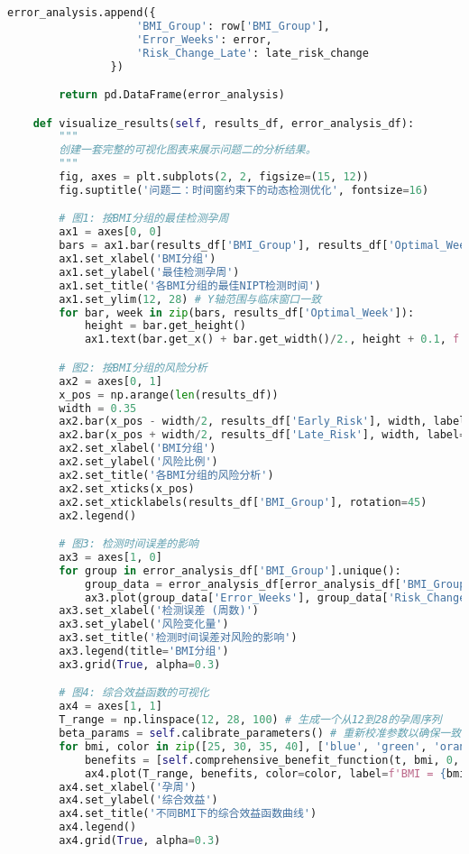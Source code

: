 \documentclass[UTF8, a4paper, 11pt]{ctexart}
\begin{document}
\begin{lstlisting}[language=Python, caption={问题二的解决方案脚本。}]
                error_analysis.append({
                    'BMI_Group': row['BMI_Group'],
                    'Error_Weeks': error,
                    'Risk_Change_Late': late_risk_change
                })

        return pd.DataFrame(error_analysis)

    def visualize_results(self, results_df, error_analysis_df):
        """
        创建一套完整的可视化图表来展示问题二的分析结果。
        """
        fig, axes = plt.subplots(2, 2, figsize=(15, 12))
        fig.suptitle('问题二：时间窗约束下的动态检测优化', fontsize=16)

        # 图1: 按BMI分组的最佳检测孕周
        ax1 = axes[0, 0]
        bars = ax1.bar(results_df['BMI_Group'], results_df['Optimal_Week'], color='steelblue', alpha=0.7, edgecolor='black')
        ax1.set_xlabel('BMI分组')
        ax1.set_ylabel('最佳检测孕周')
        ax1.set_title('各BMI分组的最佳NIPT检测时间')
        ax1.set_ylim(12, 28) # Y轴范围与临床窗口一致
        for bar, week in zip(bars, results_df['Optimal_Week']):
            height = bar.get_height()
            ax1.text(bar.get_x() + bar.get_width()/2., height + 0.1, f'{week:.1f}', ha='center', va='bottom')

        # 图2: 按BMI分组的风险分析
        ax2 = axes[0, 1]
        x_pos = np.arange(len(results_df))
        width = 0.35
        ax2.bar(x_pos - width/2, results_df['Early_Risk'], width, label='过早检测风险', color='orange', alpha=0.7)
        ax2.bar(x_pos + width/2, results_df['Late_Risk'], width, label='过晚检测风险', color='red', alpha=0.7)
        ax2.set_xlabel('BMI分组')
        ax2.set_ylabel('风险比例')
        ax2.set_title('各BMI分组的风险分析')
        ax2.set_xticks(x_pos)
        ax2.set_xticklabels(results_df['BMI_Group'], rotation=45)
        ax2.legend()

        # 图3: 检测时间误差的影响
        ax3 = axes[1, 0]
        for group in error_analysis_df['BMI_Group'].unique():
            group_data = error_analysis_df[error_analysis_df['BMI_Group'] == group]
            ax3.plot(group_data['Error_Weeks'], group_data['Risk_Change_Late'], 'o-', label=group, linewidth=2, markersize=6)
        ax3.set_xlabel('检测误差 (周数)')
        ax3.set_ylabel('风险变化量')
        ax3.set_title('检测时间误差对风险的影响')
        ax3.legend(title='BMI分组')
        ax3.grid(True, alpha=0.3)

        # 图4: 综合效益函数的可视化
        ax4 = axes[1, 1]
        T_range = np.linspace(12, 28, 100) # 生成一个从12到28的孕周序列
        beta_params = self.calibrate_parameters() # 重新校准参数以确保一致
        for bmi, color in zip([25, 30, 35, 40], ['blue', 'green', 'orange', 'red']):
            benefits = [self.comprehensive_benefit_function(t, bmi, 0, beta_params) for t in T_range]
            ax4.plot(T_range, benefits, color=color, label=f'BMI = {bmi}', linewidth=2)
        ax4.set_xlabel('孕周')
        ax4.set_ylabel('综合效益')
        ax4.set_title('不同BMI下的综合效益函数曲线')
        ax4.legend()
        ax4.grid(True, alpha=0.3)


\end{lstlisting}
\end{document}
